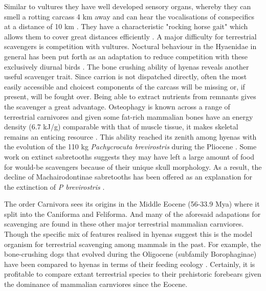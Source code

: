 \documentclass[a4paper,12pt]{article}
\begin{document}
Similar to vultures they have well developed sensory organs, whereby they can smell a rotting carcass 4 km away and can hear the vocalisations of conspecifics at a distance of 10 km \citep{mills1989comparative}. They have a characteristic "rocking horse gait"  which allows them to cover great distances efficiently \citep{jones2015african}. A major difficulty for terrestrial scavengers is competition with vultures. Noctural behaviour in the Hyaenidae in general has been put forth as an adaptation to reduce competition with these exclusively diurnal birds \citep{gittleman2013carnivore}. The bone crushing ability of hyenas reveals another useful scavenger trait. Since carrion is not dispatched directly, often the most easily accessible and choicest components of the carcass will be missing or, if present, will be fought over. Being able to extract nutrients from remnants gives the scavenger a great advantage. Osteophagy is known across a range of terrestrial carnivores and given some fat-rich mammalian bones have an energy density (6.7 kJ/g) comparable with that of muscle tissue, it makes skeletal remains an enticing resource \citep{brown1989study}. This ability reached its zenith among hyenas with the evolution of the 110 kg \textit{Pachycrocuta brevirostris} during the Pliocene \citep{palmqvist2011giant}. Some work on extinct sabretooths suggests they may have left a large amount of food for would-be scavengers because of their unique skull morphology. As a result, the decline of Machairodontinae sabretooths has been offered as an explanation for the extinction of \textit{P brevirostris} \citep{palmqvist2011giant}. 

The order Carnivora sees its origins in the Middle Eocene (56-33.9 Mya) where it split into the Caniforma and Feliforma. And many of the aforesaid adapations for scavenging are found in these other major terrestrial mammalian carnviores. Though the specific mix of features realised in hyenas suggest this is the model organism for terrestrial scavenging among mammals in the past. For example, the bone-crushing dogs that evolved during the Oligocene (subfamily Borophaginae) have been compared to hyenas in terms of their feeding ecology \citep{van2003chapter,martin2016pursuit}. Certainly, it is profitable to compare extant terrestrial species to their prehistoric forebears given the dominance of mammalian carnviores since the Eocene.  
\end{document}
